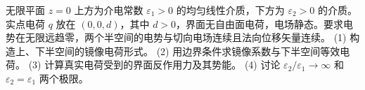 无限平面 \(z=0\) 上方为介电常数 \(\varepsilon_1>0\) 的均匀线性介质，下方为 \(\varepsilon_2>0\) 的介质。实点电荷 \(q\) 放在 \((0,0,d)\)，其中 \(d>0\)，界面无自由面电荷，电场静态。要求电势在无限远趋零，两个半空间的电势与切向电场连续且法向位移矢量连续。
(1) 构造上、下半空间的镜像电荷形式。
(2) 用边界条件求镜像系数与下半空间等效电荷。
(3) 计算真实电荷受到的界面反作用力及其势能。
(4) 讨论 \(\varepsilon_2/\varepsilon_1\to\infty\) 和 \(\varepsilon_2=\varepsilon_1\) 两个极限。
